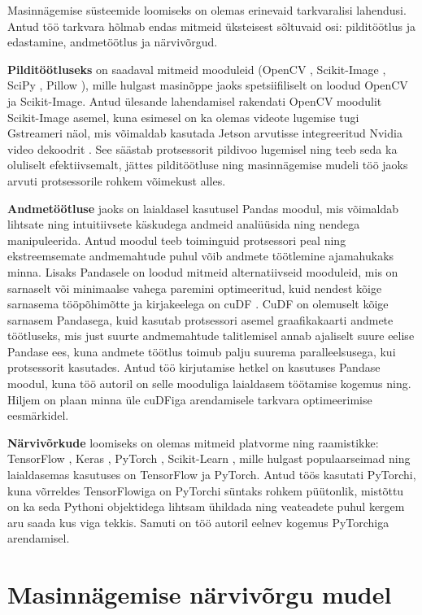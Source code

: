 
Masinnägemise süsteemide loomiseks on olemas erinevaid tarkvaralisi lahendusi. Antud töö tarkvara hõlmab endas mitmeid üksteisest sõltuvaid osi: pilditöötlus ja edastamine, andmetöötlus ja närvivõrgud.

\textbf{Pilditöötluseks} on saadaval mitmeid mooduleid (OpenCV \cite{ref36}, Scikit-Image \cite{ref37}, SciPy \cite{ref38}, Pillow \cite{ref39}), mille hulgast masinõppe jaoks spetsiifiliselt on loodud OpenCV ja Scikit-Image. Antud ülesande lahendamisel rakendati OpenCV moodulit Scikit-Image asemel, kuna esimesel on ka olemas videote lugemise tugi Gstreameri \cite{ref40} näol, mis võimaldab kasutada Jetson arvutisse integreeritud Nvidia video dekoodrit \cite{ref41}. See säästab protsessorit pildivoo lugemisel ning teeb seda ka oluliselt efektiivsemalt, jättes pilditöötluse ning masinnägemise mudeli töö jaoks arvuti protsessorile rohkem võimekust alles.

\textbf{Andmetöötluse} jaoks on laialdasel kasutusel Pandas \cite{ref42} moodul, mis võimaldab lihtsate ning intuitiivsete käskudega andmeid analüüsida ning nendega manipuleerida. Antud moodul teeb toiminguid protsessori peal ning ekstreemsemate andmemahtude puhul võib andmete töötlemine ajamahukaks minna. Lisaks Pandasele on loodud mitmeid alternatiivseid mooduleid, mis on sarnaselt või minimaalse vahega paremini optimeeritud, kuid nendest kõige sarnasema tööpõhimõtte ja kirjakeelega on cuDF \cite{ref44}. CuDF on olemuselt kõige sarnasem Pandasega, kuid kasutab protsessori asemel graafikakaarti andmete töötluseks, mis just suurte andmemahtude talitlemisel annab ajaliselt suure eelise Pandase ees, kuna andmete töötlus toimub palju suurema paralleelsusega, kui protsessorit kasutades. Antud töö kirjutamise hetkel on kasutuses Pandase moodul, kuna töö autoril on selle mooduliga laialdasem töötamise kogemus ning. Hiljem on plaan minna üle cuDFiga arendamisele tarkvara optimeerimise eesmärkidel.

\textbf{Närvivõrkude} loomiseks on olemas mitmeid platvorme ning raamistikke: TensorFlow \cite{ref45}, Keras \cite{ref46}, PyTorch \cite{ref47}, Scikit-Learn \cite{ref48}, mille hulgast populaarseimad ning laialdasemas kasutuses on TensorFlow ja PyTorch. Antud töös kasutati PyTorchi, kuna võrreldes TensorFlowiga on PyTorchi süntaks rohkem püütonlik, mistõttu on ka seda Pythoni objektidega lihtsam ühildada ning veateadete puhul kergem aru saada kus viga tekkis. Samuti on töö autoril eelnev kogemus PyTorchiga arendamisel.

\section{Masinnägemise närvivõrgu mudel}\label{masinnuxe4gemise-nuxe4rvivuxf5rgu-mudel}

